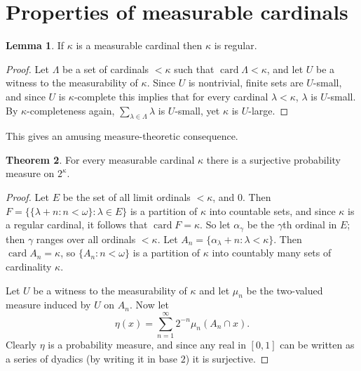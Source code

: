 \documentclass[12pt]{report}
\newcommand{\card}{\operatorname{card}}
\theoremstyle{definition}
\newtheorem{theorem}{Theorem}[chapter]
\newtheorem{lemma}[theorem]{Lemma}
\begin{document}
\section{Properties of measurable cardinals}
\begin{lemma}
If $\kappa$ is a measurable cardinal then $\kappa$ is regular.
\end{lemma}
\begin{proof}
Let $\Lambda$ be a set of cardinals $ < \kappa$ such that $\card \Lambda < \kappa$, and let $U$ be a witness to the measurability of $\kappa$.
Since $U$ is nontrivial, finite sets are $U$-small, and since $U$ is $\kappa$-complete this implies that for every cardinal $\lambda < \kappa$, $\lambda$ is $U$-small.
By $\kappa$-completeness again, $\sum_{\lambda \in \Lambda} \lambda$ is $U$-small, yet $\kappa$ is $U$-large.
\end{proof}
This gives an amusing measure-theoretic consequence.
\begin{theorem}
For every measurable cardinal $\kappa$ there is a surjective probability measure on $2^\kappa$.
\end{theorem}
\begin{proof}
Let $E$ be the set of all limit ordinals $<\kappa$, and $0$. Then $F = \{\{\lambda + n: n < \omega\}: \lambda \in E\}$ is a partition of $\kappa$ into countable sets, and since $\kappa$ is a regular cardinal, it follows that $\card F = \kappa$.
So let $\alpha_\gamma$ be the $\gamma$th ordinal in $E$; then $\gamma$ ranges over all ordinals $< \kappa$. Let $A_n = \{\alpha_\lambda + n: \lambda < \kappa\}$. Then $\card A_n = \kappa$, so $\{A_n: n < \omega\}$ is a partition of $\kappa$ into countably many sets of cardinality $\kappa$.

Let $U$ be a witness to the measurability of $\kappa$ and let $\mu_n$ be the two-valued measure induced by $U$ on $A_n$. Now let
$$\eta(x) = \sum_{n=1}^\infty 2^{-n}\mu_n(A_n \cap x).$$
Clearly $\eta$ is a probability measure, and since any real in $[0, 1]$ can be written as a series of dyadics (by writing it in base $2$) it is surjective.
\end{proof}
\end{document}
